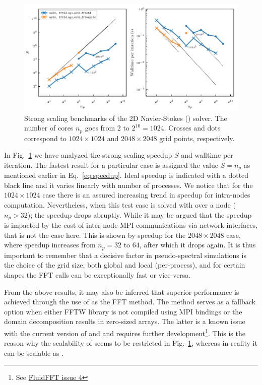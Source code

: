 \begin{figure}[htp]
\centering
\includegraphics[width=\linewidth]{tmp/fig_bench_strong2d}
\caption{Strong scaling benchmarks of the 2D Navier-Stokes
() solver. The number of cores $n_p$ goes from 2
to $2^{10} = 1024$. Crosses and dots correspond to $1024\times1024$ and
$2048\times2048$ grid points, respectively.}
\label{fig:strong2d}
\end{figure}

In Fig.~\ref{fig:strong2d} we have analyzed the strong scaling speedup $S$ and
walltime per iteration. The fastest result for a particular case is assigned
the value $S=n_p$ as mentioned earlier in Eq.~\ref{eq:speedup}. Ideal speedup
is indicated with a dotted black line and it varies linearly with number of
processes.  We notice that for the $1024\times1024$ case there is an assured
increasing trend in speedup for intra-nodes computation.
%
Nevertheless, when this test case is solved with over a node ($n_p > 32$); the
speedup drops abruptly. While it may be argued that the speedup is impacted by
the cost of inter-node MPI communications via network interfaces, that is not
the case here. This is shown by speedup for the $2048\times2048$ case, where
speedup increases from $n_p = 32$ to $64$, after which it drops again. It is thus
important to remember that a decisive factor in pseudo-spectral simulations is
the choice of the grid size, both global and local (per-process), and for certain
shapes the FFT calls can be exceptionally fast or vice-versa.

%

From the above results, it may also be inferred that superior performance is
achieved through the use of  as the FFT
method. The  method serves as a fallback
option when either FFTW library is not compiled using MPI bindings or the
domain decomposition results in zero-sized arrays. The latter is a known issue
with the current version of  and  and requires
further development\footnote{See
  \href{https://bitbucket.org/fluiddyn/fluidfft/issues/4}{FluidFFT issue 4}}.
This is the reason why the scalability of
 seems to be restricted
in Fig.~\ref{fig:strong2d}, whereas in reality it can be scalable as
.

